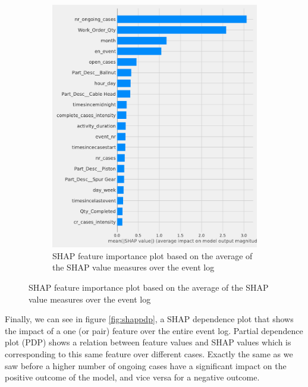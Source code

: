 \begin{figure}[!htbp]
\begin{subfigure}{0.48\textwidth}
		\includegraphics[width=\linewidth]{images/shap/feature_importance.pdf}
		\caption[SHAP feature importance plot]{SHAP feature importance plot based on the average of the SHAP value measures over the event log }
		\label{fig:shap12}
	\end{subfigure}\hspace*{\fill}
\end{figure}


Finally, we can see in figure \ref{fig:shappdp}, a SHAP dependence plot that shows the impact of a one (or pair) feature over the entire event log. Partial dependence plot (PDP) shows a relation between feature values and SHAP values which is corresponding to this same feature over different cases. Exactly the same as we saw before a higher number of ongoing cases have a significant impact on the positive outcome of the model, and vice versa for a negative outcome. 

